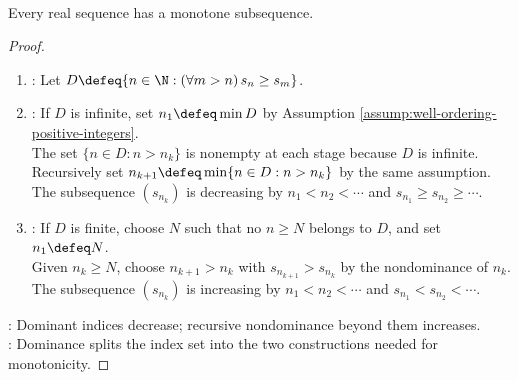 \begin{theorem} \label{thm:monotone-subsequence-theorem} \\
Every real sequence has a monotone subsequence.
\begin{proof}
\begin{enumerate}[label=(\roman*)]
\setlength{\itemsep}{0pt}
\item {}: Let $D\defeq\{n\in\N:(\forall m>n)\,s_n\geq s_m\}$.
\item {}: If $D$ is infinite, set $n_1\defeq\min D$ by Assumption \ref{assump:well-ordering-positive-integers}.\\
The set $\{n\in D:n>n_k\}$ is nonempty at each stage because $D$ is infinite.\\
Recursively set $n_{k+1}\defeq\min\{n\in D:n>n_k\}$ by the same assumption.\\
The subsequence $(s_{n_k})$ is decreasing by $n_1<n_2<\cdots$ and $s_{n_1}\geq s_{n_2}\geq\cdots$.
\item {}: If $D$ is finite, choose $N$ such that no $n\geq N$ belongs to $D$, and set $n_1\defeq N$.\\
Given $n_k\geq N$, choose $n_{k+1}>n_k$ with $s_{n_{k+1}}>s_{n_k}$ by the nondominance of $n_k$.\\
The subsequence $(s_{n_k})$ is increasing by $n_1<n_2<\cdots$ and $s_{n_1}<s_{n_2}<\cdots$.
\end{enumerate}
: Dominant indices decrease; recursive nondominance beyond them increases.\\
: Dominance splits the index set into the two constructions needed for monotonicity.
\end{proof}
\end{theorem}

